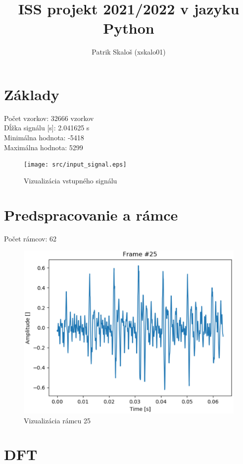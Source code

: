 \documentclass{article}
\title{ISS projekt 2021/2022 v jazyku Python}
\author{Patrik Skaloš (xskalo01)}
\begin{document}
  \maketitle


  \section{Základy}
  Počet vzorkov: 32666 vzorkov \\
  Dĺžka signálu [s]:  2.041625 s \\
  Minimálna hodnota: -5418 \\
  Maximálna hodnota: 5299 \\
  \begin{figure}[H]
    \texttt{[image: src/input\_signal.eps]}
    \caption{Vizualizácia vstupného signálu}
  \end{figure}

  \newpage


  \section{Predspracovanie a rámce}
  Počet rámcov: 62
  \begin{figure}[H]
    \includegraphics[width=\textwidth]{src/frame25.eps}
    \caption{Vizualizácia rámcu 25}
  \end{figure}


  \section{DFT}
\end{document}
